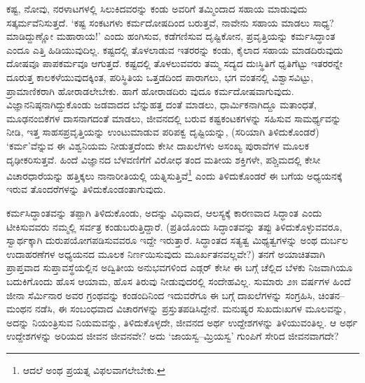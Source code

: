 ಕಷ್ಟ, ನೋವು, ನರಳಾಟಗಳಲ್ಲಿ ಸಿಲುಕಿದವರನ್ನು ಕಂಡು ಅವರಿಗೆ ತಮ್ಮಿಂದಾದ ಸಹಾಯ ಮಾಡುವುದು ಸತ್ಕರ್ಮವೆನಿಸುತ್ತದೆ. ‘ಕಷ್ಟ ಸಂಕಟಗಳು ಕರ್ಮದೋಷದಿಂದ ಬರುತ್ತವೆ, ನಾವೇನು ಸಹಾಯ ಮಾಡಲು ಸಾಧ್ಯ? ಮಾಡಿದ್ದುಣ್ಣೋ ಮಹಾರಾಯ!’ ಎಂದು ಹಂಗಿಸುವ, ಕಡೆಗಣಿಸುವ ದೃಷ್ಟಿಕೋನ, ಪ್ರವೃತ್ತಿಯನ್ನು ಕರ್ಮಸಿದ್ಧಾಂತ ಎಂದೂ ಎತ್ತಿ ಹಿಡಿಯುವುದಿಲ್ಲ. ಕಷ್ಟದಲ್ಲಿ ತೊಳಲಾಡುವ ಇತರರನ್ನು ಕಂಡು, ಕೈಲಾದ ಸಹಾಯ ಮಾಡದಿರುವುದು ದೋಷವೂ ಪಾಪ\-ಕರ್ಮವೂ ಆಗುತ್ತದೆ. ಕಷ್ಟದಲ್ಲಿ ತೊಳಲುವವರು ತಮ್ಮ ಸದ್ಯದ ದುಃಸ್ಥಿತಿಗೆ ಧೃತಿಗೆಟ್ಟು ಇತರರನ್ನೇ ದೂರುತ್ತ ಕಾಲಕಳೆಯುವುದಕ್ಕಿಂತ, ಪರಿಸ್ಥಿತಿಯ ಒತ್ತಡದಿಂದ ಪಾರಾಗಲು, ಭಗ ವಂತನಲ್ಲಿ ವಿಶ್ವಾಸ\-ವಿಟ್ಟು, ಪ್ರಾಮಾಣಿಕರಾಗಿ ಹೋರಾಡಲೇಬೇಕು. ಹಾಗೆ ಹೋರಾಡದಿರು ವುದೂ ಕರ್ಮ\-ದೋಷವಾಗುವುದು. ವಿಜ್ಞಾನನಿಷ್ಠನಾಗಿದ್ದುಕೊಂಡು ಜಡವಾದದ ಬೆನ್ನುಹತ್ತ ದಂತೆ ಮಾಡಲು, ಧಾರ್ಮಿಕನಾಗಿದ್ದೂ ಮತಾಂಧತೆ, ಮೂಢನಂಬಿಕೆಗಳ ದಾಸನಾಗದಂತೆ ಮಾಡಲು, ಜೀವನದಲ್ಲಿ ಬರುವ ಕಷ್ಟಕಂಟಕಗಳನ್ನು ಸಹಿಸುವ ಸಾಮರ್ಥ್ಯವನ್ನು ನೀಡಿ, ಇತ್ತ ಸಾಹಸಪ್ರವೃತ್ತಿಯನ್ನು ಉಂಟುಮಾಡುವ ಪರಿಪಕ್ವ ದೃಷ್ಟಿಯನ್ನು, (ಸರಿಯಾಗಿ ತಿಳಿದುಕೊಂಡರೆ) ‘ಕರ್ಮ’ವೆನ್ನುವ ಈ ವಿಶ್ವನಿಯಮ ನೀಡುತ್ತದೆಂದು ಕೇಸೀ ದಾಖಲೆಗಳು ಅಸಂಖ್ಯ ಪುರಾವೆಗಳ ಮೂಲಕ ದೃಢೀಕರಿಸುತ್ತವೆ. ಹಿಂದೆ ವಿಜ್ಞಾನದ ಬೆಳವಣಿಗೆಗೆ ವಿರೋಧ ತಂದ ಮತೀಯ ಶಕ್ತಿಗಳೇ, ಪಶ್ಚಿಮದಲ್ಲಿ ಕೇಸೀ ವಿಚಾರಧಾರೆಯನ್ನು ಹತ್ತಿಕ್ಕಲು ನಾನಾರೀತಿಯಲ್ಲಿ ಯತ್ನಿಸುತ್ತಿವೆ\footnote{ಆದಲೆ ಅಂಥ ಪ್ರಯತ್ನ ವಿಫಲವಾಗಲೇಬೇಕು. } ಎಂದು ತಿಳಿದುಕೊಂಡರೆ ಈ ಬಗೆಯ ಅಧ್ಯಯನಕ್ಕೆ ಇರುವ ತೊಂದರೆಗಳನ್ನು ತಿಳಿದುಕೊಂಡಂತಾಗುವುದು.

ಕರ್ಮಸಿದ್ಧಾಂತವನ್ನು ತಪ್ಪಾಗಿ ತಿಳಿದುಕೊಂಡು, ಅದನ್ನು ವಿಧಿವಾದ, ಆಲಸ್ಯಕ್ಕೆ ಕಾರಣವಾದ ಸಿದ್ಧಾಂತ ಎಂದು ಟೀಕಿಸುವವರು ನಮ್ಮಲ್ಲಿ ಸರ್ವತ್ರ ಕಂಡುಬರುತ್ತಿದ್ದಾರೆ. (ಪ್ರತಿಯೊಂದು ಸಿದ್ಧಾಂತವನ್ನು ತಪ್ಪು ತಿಳಿದುಕೊಳ್ಳುವವರೂ, ಸ್ವಾರ್ಥಕ್ಕಾಗಿ ದುರುಪಯೋಗಪಡಿಸುವವರೂ ಇದ್ದೇ ಇರುತ್ತಾರೆ. ಸಿದ್ಧಾಂತದ ಸತ್ಯತ್ವ ಮಿಥ್ಯತ್ವಗಳನ್ನು ಅಂಥ ದುರ್ಬಲ ಉದಾಹರಣೆಗಳ ಅಧ್ಯಯನದ ಮೂಲಕ ನಿರ್ಣಯಿಸುವುದು ಮೂರ್ಖತನವಲ್ಲವೇ?) ತನಗೆ ಅಯಾಚಿತವಾಗಿ ಪ್ರಾಪ್ತವಾದ ಸುಪ್ತಾವಸ್ಥೆಯಲ್ಲಿನ ಅದ್ವಿತೀಯ ಅನುಭವಗಳಿಂದ ಎಡ್ಗರ್ ಕೇಸೀ ಈ ಬಗ್ಗೆ ಚೆಲ್ಲಿದ ಬೆಳಕು ನಿಜವಾಗಿಯೂ ಬದುಕಿಗೊಂದು ಹೊಸ ಆಯಾಮ, ಹೊಸ ತಿರುವು ನೀಡುವುದರಲ್ಲಿ ಸಂದೇಹವಿಲ್ಲ. ಸುಮಾರು ೨೫ ವರ್ಷಗಳ ಹಿಂದೆ ಜೀನಾ ಸೆರ್ಮಿನಾರ ಅವರ  ಗ್ರಂಥವನ್ನು ಕಂಡಂದಿನಿಂದ ಇದುವರೆಗೂ ಈ ಬಗ್ಗೆ ದಾಖಲೆಗಳನ್ನು ಸಂಗ್ರಹಿಸಿ, ಚಿಂತನ–ಮಂಥನ ನಡೆಸಿ, ಈ ಸಂಬಂಧವಾದ ವಿಚಾರಗಳನ್ನು ಪ್ರಸ್ತುತಪಡಿಸಿದ್ದೇನೆ. ಮನುಷ್ಯರ ಸುಖದುಃಖಗಳ ಮೂಲವನ್ನು, ಅದನ್ನು ನಿಯಂತ್ರಿಸುವ ನಿಯಮವನ್ನು, ತಿಳಿದುಕೊಳ್ಳದೇ, ಜೀವನದ ಅರ್ಥ ಉದ್ದೇಶಗಳನ್ನು ತಿಳಿಯುವಂತಿಲ್ಲ. ಆ ಅರ್ಥ ಉದ್ದೇಶಗಳನ್ನು ಅರಿಯದ ಜೀವನ ಜೀವನವೇ? ಅದು ‘ಜಾಯಸ್ವ–ಮ್ರಿಯಸ್ವ’ ಗುಂಪಿಗೆ ಸೇರಿದ ಜೀವನವಾಗದೇ?

